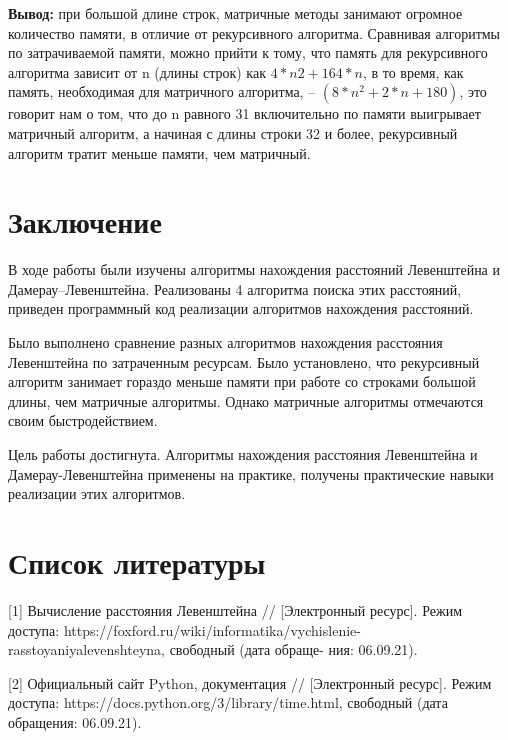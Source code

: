 \documentclass[a4paper,12pt]{article}
\begin{document}
\vspace{\baselineskip}

\textbf{Вывод:} при большой длине строк, матричные методы занимают огромное количество памяти, в отличие от рекурсивного алгоритма. Сравнивая алгоритмы по затрачиваемой памяти, можно прийти к тому, что память для рекурсивного алгоритма зависит от n (длины строк) как $4*n2 + 164*n$, в то время, как память, необходимая для матричного алгоритма, – $(8 * n^2 + 2*n + 180)$, это говорит нам о том, что до n равного 31 включительно по памяти выигрывает матричный алгоритм, а начиная с длины строки 32 и более, рекурсивный алгоритм тратит меньше памяти, чем матричный.

\clearpage


\section*{Заключение}

В ходе работы были изучены алгоритмы нахождения расстояний Левенштейна и Дамерау–Левенштейна. Реализованы 4 алгоритма поиска этих расстояний, приведен программный код реализации алгоритмов нахождения расстояний.

Было выполнено сравнение разных алгоритмов нахождения расстояния Левенштейна по затраченным ресурсам. Было установлено, что рекурсивный алгоритм занимает гораздо меньше памяти при работе со строками большой длины, чем матричные алгоритмы. Однако матричные алгоритмы отмечаются своим быстродействием. 

Цель работы достигнута. Алгоритмы нахождения расстояния Левенштейна и Дамерау-Левенштейна применены на практике, получены практические навыки реализации этих алгоритмов.

\clearpage


\section*{Список литературы}

[1] Вычисление расстояния Левенштейна // [Электронный ресурс]. Режим доступа: https://foxford.ru/wiki/informatika/vychislenie-rasstoyaniyalevenshteyna, свободный (дата обраще- ния: 06.09.21).

\vspace{\baselineskip}

[2] Официальный сайт Python, документация // [Электронный ресурс]. Режим доступа: https://docs.python.org/3/library/time.html, свободный (дата обращения: 06.09.21).
\end{document}
